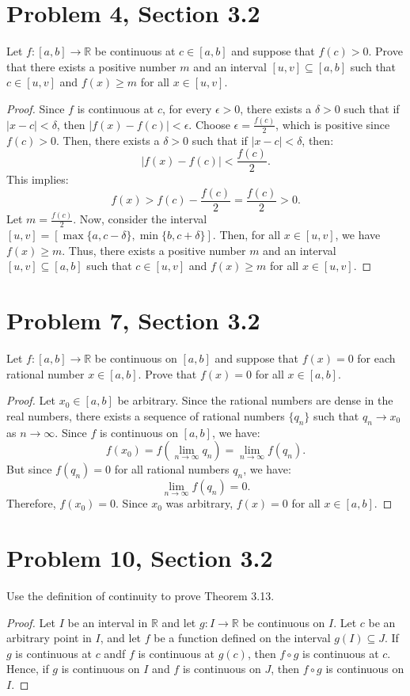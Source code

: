 \documentclass[12pt]{article}
\begin{document}
  \section*{Problem 4, Section 3.2}
  Let $f:[a,b] \to \mathbb{R}$ be continuous at $c \in [a,b]$ and suppose that $f(c) > 0$. Prove that there exists a positive number $m$ and an interval $[u, v] \subseteq [a, b]$ such that $c \in [u, v]$ and $f(x) \geq m$ for all $x \in [u, v]$.
  \begin{proof}
    Since $f$ is continuous at $c$, for every $\epsilon > 0$, there exists a $\delta > 0$ such that if $|x - c| < \delta$, then $|f(x) - f(c)| < \epsilon$. 
    Choose $\epsilon = \frac{f(c)}{2}$, which is positive since $f(c) > 0$. 
    Then, there exists a $\delta > 0$ such that if $|x - c| < \delta$, then:
    \[
    |f(x) - f(c)| < \frac{f(c)}{2}.
    \]
    This implies:
    \[
    f(x) > f(c) - \frac{f(c)}{2} = \frac{f(c)}{2} > 0.
    \]
    Let $m = \frac{f(c)}{2}$. 
    Now, consider the interval $[u, v] = [\max\{a, c - \delta\}, \min\{b, c + \delta\}]$. 
    Then, for all $x \in [u, v]$, we have $f(x) \geq m$.
    Thus, there exists a positive number $m$ and an interval $[u, v] \subseteq [a, b]$ such that $c \in [u, v]$ and $f(x) \geq m$ for all $x \in [u, v]$.
  \end{proof}
  \newpage



  \section*{Problem 7, Section 3.2}
  Let $f:[a,b] \to \mathbb{R}$ be continuous on $[a,b]$ and suppose that $f(x) = 0$ for each rational number $x \in [a,b]$. Prove that $f(x) = 0$ for all $x \in [a,b]$.
  \begin{proof}
    Let $x_0 \in [a,b]$ be arbitrary. 
    Since the rational numbers are dense in the real numbers, there exists a sequence of rational numbers $\{q_n\}$ such that $q_n \to x_0$ as $n \to \infty$. 
    Since $f$ is continuous on $[a,b]$, we have:
    \[
    f(x_0) = f\left(\lim_{n \to \infty} q_n\right) = \lim_{n \to \infty} f(q_n).
    \]
    But since $f(q_n) = 0$ for all rational numbers $q_n$, we have:
    \[
    \lim_{n \to \infty} f(q_n) = 0.
    \]
    Therefore, $f(x_0) = 0$. 
    Since $x_0$ was arbitrary, $f(x) = 0$ for all $x \in [a,b]$.

  \end{proof}
  \newpage



  \section*{Problem 10, Section 3.2}
  Use the definition of continuity to prove Theorem 3.13. 
  \begin{proof}
    Let $I$ be an interval in $\mathbb{R}$ and let $g:I \to \mathbb{R}$ be continuous on $I$. Let $c$ be an arbitrary point in $I$, and let $f$ be a function defined on the interval $g(I) \subseteq J$. 
    If $g$ is continuous at $c$ andf $f$ is continuous at $g(c)$, then $f \circ g$ is continuous at $c$. Hence, if $g$ is continuous on $I$ and $f$ is continuous on $J$, then $f \circ g$ is continuous on $I$.
  \end{proof}
\end{document}
